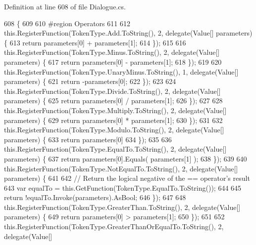 Definition at line 608 of file Dialogue.\-cs.


\begin{DoxyCode}
608                                      \{
609 
610 \textcolor{preprocessor}{                #region Operators}
611 \textcolor{preprocessor}{}
612                 this.RegisterFunction(TokenType.Add.ToString(), 2, delegate(Value[] parameters) \{
613                     \textcolor{keywordflow}{return} parameters[0] + parameters[1];
614                 \});
615 
616                 this.RegisterFunction(TokenType.Minus.ToString(), 2, delegate(Value[] parameters) \{
617                     \textcolor{keywordflow}{return} parameters[0] - parameters[1];
618                 \});
619 
620                 this.RegisterFunction(TokenType.UnaryMinus.ToString(), 1, delegate(Value[] parameters) \{
621                     \textcolor{keywordflow}{return} -parameters[0];
622                 \});
623 
624                 this.RegisterFunction(TokenType.Divide.ToString(), 2, delegate(Value[] parameters) \{
625                     \textcolor{keywordflow}{return} parameters[0] / parameters[1];
626                 \});
627 
628                 this.RegisterFunction(TokenType.Multiply.ToString(), 2, delegate(Value[] parameters) \{
629                     \textcolor{keywordflow}{return} parameters[0] * parameters[1];
630                 \});
631 
632                 this.RegisterFunction(TokenType.Modulo.ToString(), 2, delegate(Value[] parameters) \{
633                     \textcolor{keywordflow}{return} parameters[0] %
634                 \});
635 
636                 this.RegisterFunction(TokenType.EqualTo.ToString(), 2, delegate(Value[] parameters) \{
637                     \textcolor{keywordflow}{return} parameters[0].Equals( parameters[1] );
638                 \});
639 
640                 this.RegisterFunction(TokenType.NotEqualTo.ToString(), 2, delegate(Value[] parameters) \{
641 
642                     \textcolor{comment}{// Return the logical negative of the == operator's result}
643                     var equalTo = this.GetFunction(TokenType.EqualTo.ToString());
644 
645                     \textcolor{keywordflow}{return} !equalTo.Invoke(parameters).AsBool;
646                 \});
647 
648                 this.RegisterFunction(TokenType.GreaterThan.ToString(), 2, delegate(Value[] parameters) \{
649                     \textcolor{keywordflow}{return} parameters[0] > parameters[1];
650                 \});
651 
652                 this.RegisterFunction(TokenType.GreaterThanOrEqualTo.ToString(), 2, delegate(Value[] 

\end{DoxyCode}
